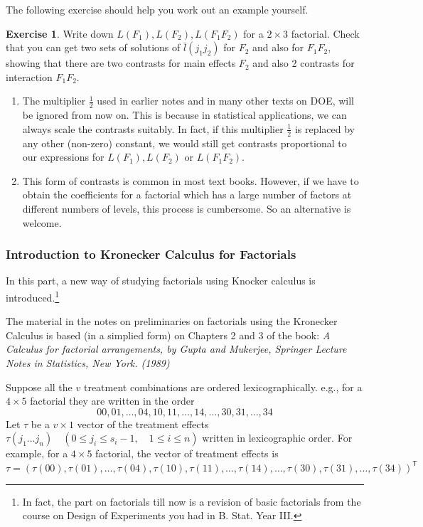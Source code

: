 \documentclass[12pt]{article}
\newcommand{\transpose}{\mathsf{T}}
\theoremstyle{definition}
\newtheorem{ex}{Exercise}
\newenvironment{note}{
\begin{tcolorbox}[colback=blue!5!white,colframe=blue!75!black,title=Note, parbox = false] }{\end{tcolorbox} }
\newenvironment{remark}{
\begin{tcolorbox}[colback=blue!5!white,colframe=blue!75!black,title=Remark, parbox = false] }{\end{tcolorbox} }
\newenvironment{exercise}{
\begin{tcolorbox}[colback=red!5!white,colframe=red!75!black, parbox = false]\begin{ex} }{\end{ex}\end{tcolorbox} }
\begin{document}
The following exercise should help you work out an example yourself.

\begin{exercise}
    Write down $L(F_1), L(F_2), L(F_1F_2) $ for a $2\times 3$ factorial. Check that you can get two sets of solutions of $\bar{l}(j_1j_2) $  for $F_2$ and also for $F_1F_2$, showing that there are two contrasts for main effects $F_2$ and also 2 contrasts for interaction  $F_1F_2$.     
\end{exercise}
 
\begin{remark}
    \begin{enumerate}
        \item The multiplier $\frac{1}{2}$ used in earlier notes and in many other texts on DOE,  will be ignored from now on. This is because in statistical applications, we can always scale the contrasts suitably. In fact, if this multiplier  $\frac{1}{2}$ is replaced by any other (non-zero) constant, we would still get contrasts proportional to our expressions for $L(F_1), L(F_2)$ or  $L(F_1F_2)$.
        \item This form of contrasts is common in most text books. However, if we have to obtain the coefficients for a factorial which has a large number of factors at different numbers of levels, this process is cumbersome.  So an alternative is welcome.
    \end{enumerate}
\end{remark}

\subsubsection{Introduction to Kronecker Calculus for Factorials}

In this part, a new way of studying factorials using Knocker calculus is introduced.\footnote{In fact, the part on factorials till now is a revision of basic factorials from the course on Design of Experiments you had in B. Stat. Year III.}

\begin{note}
     The material in the notes on preliminaries on factorials using the Kronecker Calculus is based  (in a simplied form) on Chapters 2 and 3 of the book: \textit{A Calculus for factorial arrangements, by Gupta and Mukerjee, Springer Lecture Notes in Statistics, New York. (1989)}
\end{note}


Suppose all the $v$ treatment combinations are ordered lexicographically. e.g.,   for a $4\times 5$ factorial  they are written in the order 
$$00, 01, \ldots, 04, 10, 11, \ldots , 14, \ldots , 30, 31, \ldots, 34$$ 
Let $\tau$  be a $v\times 1$ vector of the treatment effects $\tau(j_1 \dots j_n) \quad  (0 \leq j_i \leq  s_i-1, \quad  1 \leq  i \leq n)$ written in lexicographic order. For example, for a $4\times 5$ factorial, the vector of treatment effects is $$\tau = \left(\tau(00), \tau(01), \ldots, \tau(04), \tau(10), \tau(11), \ldots , \tau(14), \ldots , \tau(30), \tau(31), \ldots, \tau(34)\right)^{\transpose}$$
\end{document}
